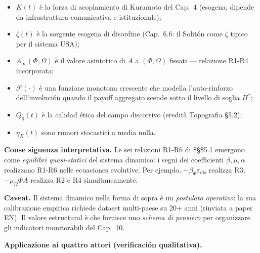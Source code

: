 \begin{itemize}
\tightlist
\item
  \(K(t)\) è la forza di acoplamiento di Kuramoto del Cap.~4 (esogena,
  dipende da infrastruttura comunicativa e istituzionale);
\item
  \(\zeta(t)\) è la sorgente esogena di disordine (Cap.~6.6: il Solitón
  come \(\zeta\) tipico per il sistema USA);
\item
  \(A_\infty(\Phi, \Omega)\) è il valore asintotico di \(A\) a
  \((\Phi, \Omega)\) fissati --- relazione R1-R4 incorporata;
\item
  \(\mathcal{F}(\cdot)\) è una funzione monotona crescente che modella
  l'auto-rinforzo dell'involución quando il payoff aggregato scende
  sotto il livello di soglia \(\Pi^*\);
\item
  \(Q_0(t)\) è la calidad ética del campo discorsivo (eredità Topografia
  \S{}5.2);
\item
  \(\eta_X(t)\) sono rumori stocastici a media nulla.
\end{itemize}

\Proved{} \textbf{Conse siguenza interpretativa.} Le sei relazioni R1-R6 di
\$\S\$5.1 emergono come \emph{equilibri quasi-statici} del sistema
dinamico: i segni dei coefficienti \(\beta, \mu, \alpha\) realizzano
R1-R6 nelle ecuaciones evolutive. Per ejemplo,
\(-\beta_\Phi \varepsilon_{\text{dis}}\) realizza R3;
\(-\mu_\Omega \Phi A\) realizza R2 e R4 simultaneamente.

\Conj{} \textbf{Caveat.} Il sistema dinamico nella forma di sopra è un
\emph{postulato operativo}: la sua calibrazione empirica richiede
dataset multi-paese su 20+ anni (rinviata a paper EN). Il valore
estructural è che fornisce uno \emph{schema di pensiero} per organizzare
gli indicatori monitorabili del Cap.~10.

\Hypoth{} \textbf{Applicazione ai quattro attori (verificación
qualitativa).}

